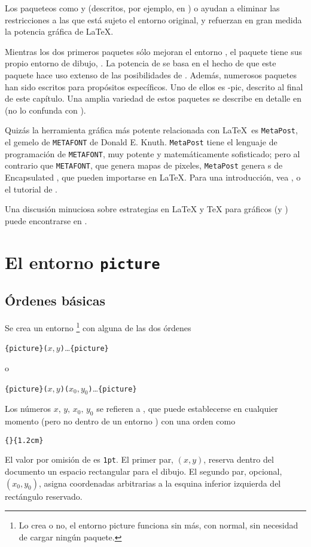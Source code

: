 Los paqueteos como  y  (descritos, por ejemplo, en \companion) o  ayudan a eliminar las restricciones a las que está sujeto el entorno  original, y refuerzan en gran medida la potencia gráfica de \LaTeX.

Mientras los dos primeros paquetes sólo mejoran el entorno , el paquete  tiene sus propio entorno de dibujo, .  La potencia de   se basa en el hecho de que este paquete hace uso extenso de las posibilidades de \PSi{}.  Además, numerosos paquetes han sido escritos para propósitos específicos.  Uno de ellos es \texorpdfstring{\Xy}{Xy}-pic, descrito al final de este capítulo.  Una amplia variedad de estos paquetes se describe en detalle en \graphicscompanion{} (no lo confunda con \companion).

Quizás la herramienta gráfica más potente relacionada con \LaTeX\ es
\texttt{MetaPost}, el gemelo de \texttt{METAFONT} de Donald E. Knuth. \texttt{MetaPost} tiene el lenguaje de programación de \texttt{METAFONT}, muy potente y matemáticamente sofisticado; pero al contrario que \texttt{METAFONT}, que genera mapas de pixeles, \texttt{MetaPost} genera \filenomo{}s de Encapsulated \PSi{}, que pueden importarse en \LaTeX.  Para una introducción, vea \hobby, o el tutorial de \cite{ursoswald}.

Una discusión minuciosa sobre estrategias en \LaTeX{} y \TeX{} para gráficos (y \fontsnomo{}) puede encontrarse en \hoenig.

\section{El entorno \texttt{picture}}

\subsection{Órdenes básicas}

Se crea un entorno \footnote{Lo crea o no, el entorno picture funciona sin más, con \LaTeXe{} normal, sin necesidad de cargar ningún paquete.} con alguna de las dos órdenes
\begin{lscommand}
\verb|{picture}(|$x,y$\verb|)|\ldots{}\verb|{picture}|
\end{lscommand}
o
\begin{lscommand}
\verb|{picture}(|$x,y$\verb|)(|$x_0,y_0$\verb|)|\ldots{}\verb|{picture}|
\end{lscommand}
Los números $x,\,y,\,x_0,\,y_0$ se refieren a , que
puede establecerse en cualquier momento
(pero no dentro de un entorno ) con una orden como
\begin{lscommand}
\verb|{|\verb|}{1.2cm}|
\end{lscommand}
El valor por omisión de  es \texttt{1pt}.  El primer par, $(x,y)$, reserva dentro del documento un espacio rectangular para el dibujo.  El segundo par, opcional, $(x_0,y_0)$, asigna coordenadas arbitrarias a la esquina inferior izquierda del rectángulo reservado.


